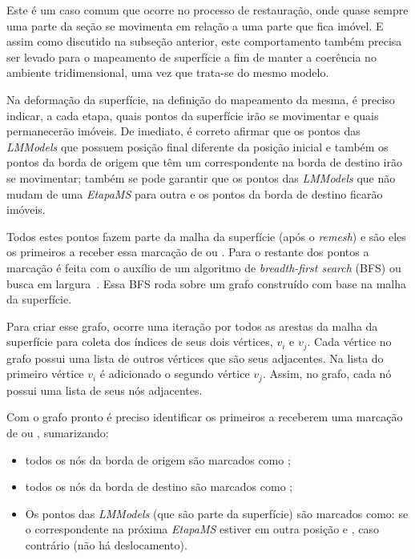 Este é um caso comum que ocorre no processo de restauração, onde quase sempre uma parte da seção se movimenta em relação a uma parte que fica imóvel. E assim como discutido na subseção anterior, este comportamento também precisa ser levado para o mapeamento de superfície a fim de manter a coerência no ambiente tridimensional, uma vez que trata-se do mesmo modelo.

Na deformação da superfície, na definição do mapeamento da mesma, é preciso indicar, a cada etapa, quais pontos da superfície irão se movimentar e quais permanecerão imóveis. De imediato, é correto afirmar que os pontos das \textit{LMModels} que possuem posição final diferente da posição inicial e também os pontos da borda de origem que têm um correspondente na borda de destino irão se movimentar; também se pode garantir que os pontos das \textit{LMModels} que não mudam de uma \textit{EtapaMS} para outra e os pontos da borda de destino ficarão imóveis.

Todos estes pontos fazem parte da malha da superfície (após o \textit{remesh}) e são eles os primeiros a receber essa marcação de  ou . Para o restante dos pontos a marcação é feita com o auxílio de um algoritmo de \textit{breadth-first search} (BFS) ou busca em largura~\cite{Nilsson}. Essa BFS roda sobre um grafo construído com base na malha da superfície. 

Para criar esse grafo, ocorre uma iteração por todos as arestas da malha da superfície para coleta dos índices de seus dois vértices, $v_i$ e $v_j$. Cada vértice no grafo possui uma lista de outros vértices que são seus adjacentes. Na lista do primeiro vértice $v_i$ é adicionado o segundo vértice $v_j$. Assim, no grafo, cada nó possui uma lista de seus nós adjacentes.

Com o grafo pronto é preciso identificar os primeiros a receberem uma marcação de  ou , sumarizando:

\renewcommand{\labelitemi}{•}
\begin{itemize}
  \item todos os nós da borda de origem são marcados como ;
  \item todos os nós da borda de destino são marcados como ;
  \item Os pontos das \textit{LMModels} (que são parte da superfície) são marcados como:  se o correspondente na próxima \textit{EtapaMS} estiver em outra posição e , caso contrário (não há deslocamento).
\end{itemize}

